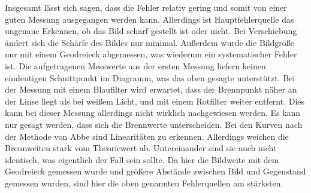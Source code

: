 Insgesamt lässt sich sagen, dass die Fehler relativ gering und somit von einer guten Messung ausgegangen werden kann. Allerdings ist Hauptfehlerquelle
das ungenaue Erkennen, ob das Bild scharf gestellt ist oder nicht. Bei Verschiebung ändert sich die Schärfe des Bildes nur minimal. Außerdem wurde
die Bildgröße nur mit einem Geodreieck abgemessen, was wiederum ein systematischer Fehler ist.
Die aufgetragenen Messwerte aus der ersten Messung liefern keinen eindeutigen Schnittpunkt im Diagramm, was das oben gesagte unterstützt.
Bei der Messung mit einem Blaufilter wird erwartet, dass der Brennpunkt näher an der Linse liegt als bei weißem Licht, und mit einem Rotfilter weiter entfernt. Dies kann bei dieser Messung allerdings nicht wirklich nachgewiesen werden. Es kann nur gesagt werden, dass sich die Brennwerte unterscheiden.
Bei den Kurven nach der Methode von Abbe sind Linearitäten zu erkennen. Allerdings weichen die Brennweiten stark vom Theoriewert ab. Untereinander sind sie auch nicht identisch, was eigentlich der Fall sein sollte. Da hier die Bildweite mit dem Geodreieck gemessen wurde und größere Abstände zwischen Bild und Gegenstand gemessen wurden, sind hier die oben genannten Fehlerquellen am stärksten.


